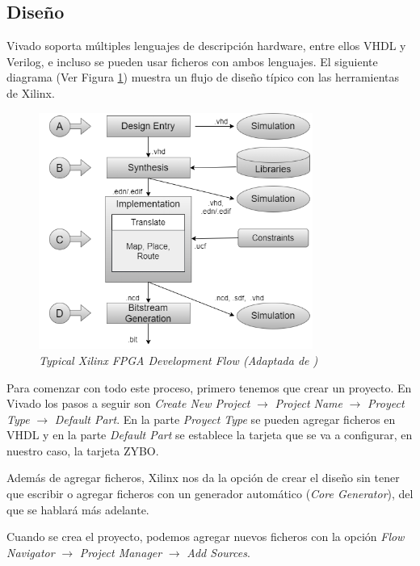 \subsection{Diseño}

Vivado soporta múltiples lenguajes de descripción hardware, entre ellos VHDL y Verilog, e incluso se pueden usar ficheros con ambos lenguajes. 
El siguiente diagrama (Ver Figura \ref{Dflow}) muestra un flujo de diseño típico con las herramientas de Xilinx.

\begin{figure}[H]
    \centering
    \includegraphics[width = 0.8\textwidth]{imagenes/flujo.png}
    \caption{\textit{Typical Xilinx FPGA Development Flow (Adaptada de \cite{smith2010fpgas})}}\label{Dflow}
\end{figure}

Para comenzar con todo este proceso, primero tenemos que crear un proyecto. En Vivado los pasos a seguir son \textit{Create New Project} 
$\rightarrow$ \textit{Project Name} $\rightarrow$ \textit{Proyect Type} $\rightarrow$ \textit{Default Part}. En la parte \textit{Proyect Type} 
se pueden agregar ficheros en VHDL y en la parte \textit{Default Part} se establece la tarjeta que se va a configurar, en nuestro caso, 
la tarjeta ZYBO. 

Además de agregar ficheros, Xilinx nos da la opción de crear el diseño sin tener que escribir o agregar ficheros con un generador automático 
(\textit{Core Generator}), del que se hablará más adelante.

Cuando se crea el proyecto, podemos agregar nuevos ficheros con la opción \textit{Flow Navigator} $\rightarrow$ \textit{Project Manager} 
$\rightarrow$ \textit{Add Sources}.

